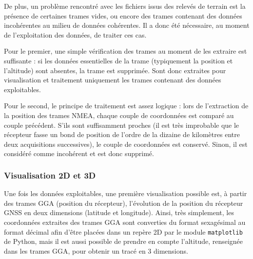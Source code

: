          De plus, un problème rencontré avec les fichiers issus des relevés de terrain est la présence de certaines trames vides, ou encore des trames contenant des données incohérentes au milieu de données cohérentes.
         Il a donc été nécessaire, au moment de l'exploitation des données, de traiter ces cas.

         Pour le premier, une simple vérification des trames au moment de les extraire est suffisante : si les données \og essentielles \fg{} de la trame (typiquement la position et l'altitude) sont absentes, la trame est supprimée.
         Sont donc extraites pour visualisation et traitement uniquement les trames contenant des données exploitables.

         Pour le second, le principe de traitement est assez logique : lors de l'extraction de la position des trames NMEA, chaque couple de coordonnées est comparé au couple précédent.
         S'ils sont suffisamment proches (il est très improbable que le récepteur fasse un bond de position de l'ordre de la dizaine de kilomètres entre deux acquisitions successives), le couple de coordonnées est conservé.
         Sinon, il est considéré comme incohérent et est donc supprimé.

      \subsubsection{Visualisation 2D et 3D}
         Une fois les données exploitables, une première visualisation possible est, à partir des trames GGA (position du récepteur), l'évolution de la position du récepteur GNSS en deux dimensions (latitude et longitude).
         Ainsi, très simplement, les coordonnées extraites des trames GGA sont converties du format sexagésimal au format décimal afin d'être placées dans un repère 2D par le module \texttt{matplotlib} de Python, mais il est aussi possible de prendre en compte l'altitude, renseignée dans les trames GGA, pour obtenir un tracé en 3 dimensions.

